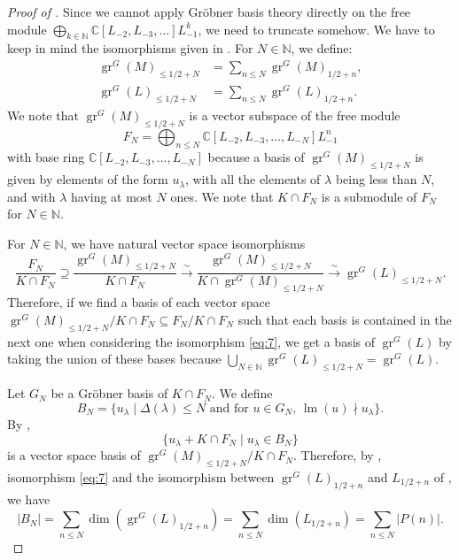 \documentclass[a4paper, 12pt, reqno]{amsart}
\theoremstyle{remark}
\DeclareMathOperator{\gr}{gr}
\DeclareMathOperator{\lm}{lm}
\begin{document}
\begin{proof}[Proof of ]
  Since we cannot apply Gröbner basis theory directly on the free module $\bigoplus_{k \in \mathbb{N}}\mathbb{C}[L_{-2}, L_{-3}, \dots]L_{-1}^k$, we need to truncate somehow.
  We have to keep in mind the isomorphisms given in .
  For $N \in \mathbb{N}$, we define:
  \begin{align*}
    \gr^G(M)_{\le 1/2 + N} &= \sum_{n \le N}\gr^G(M)_{1/2 + n}, \\
    \gr^G(L)_{\le 1/2 + N} &= \sum_{n \le N}\gr^G(L)_{1/2 + n}.
  \end{align*}
  We note that $\gr^G(M)_{\le 1/2 + N}$ is a vector subspace of the free module
  \begin{equation*}
    F_N = \bigoplus_{n \le N}\mathbb{C}[L_{-2}, L_{-3}, \dots, L_{-N}]L_{-1}^n
  \end{equation*}
  with base ring $\mathbb{C}[L_{-2}, L_{-3}, \dots, L_{-N}]$ because a basis of $\gr^G(M)_{\le 1/2 + N}$ is given by elements of the form $u_{\lambda}$, with all the elements of $\lambda$ being less than $N$, and with $\lambda$ having at most $N$ ones.
  We note that $K \cap F_N$ is a submodule of $F_N$ for $N \in \mathbb{N}$.

  For $N \in \mathbb{N}$, we have natural vector space isomorphisms
  \begin{equation}
    \label{eq:7}
    \frac{F_N}{K \cap F_N} \supseteq \frac{\gr^G(M)_{\le 1/2 + N}}{K \cap F_N} \xrightarrow{\sim} \frac{\gr^G(M)_{\le 1/2 + N}}{K \cap \gr^G(M)_{\le 1/2 + N}} \xrightarrow{\sim} \gr^G(L)_{\le 1/2 + N}.
  \end{equation}
  Therefore, if we find a basis of each vector space $\gr^G(M)_{\le 1/2 + N}/K \cap F_N \subseteq F_N/K \cap F_N$ such that each basis is contained in the next one when considering the isomorphism \eqref{eq:7}, we get a basis of $\gr^G(L)$ by taking the union of these bases because $\bigcup_{N \in \mathbb{N}}\gr^G(L)_{\le 1/2 + N} = \gr^G(L)$.

  Let $G_N$ be a Gröbner basis of $K \cap F_N$.
  We define
  \begin{equation*}
    B_N = \{u_{\lambda} \mid \text{$\Delta(\lambda) \le N$ and for $u \in G_N$, $\lm(u) \nmid u_{\lambda}$}\}.
  \end{equation*}
  By \cite[Proposition 3.6.4]{adams_introduction_1994},
  \begin{equation}
    \label{eq:8}
    \{u_{\lambda} + K \cap F_N \mid u_{\lambda} \in B_N\}
  \end{equation}
  is a vector space basis of $\gr^G(M)_{\le 1/2 + N}/K \cap F_N$.
  Therefore, by , isomorphism \eqref{eq:7} and the isomorphism between $\gr^G(L)_{1/2 + n}$ and $L_{1/2 + n}$ of , we have
  \begin{equation*}
    |B_N| = \sum_{n \le N}\dim(\gr^G(L)_{1/2 + n}) = \sum_{n \le N}\dim(L_{1/2 + n}) = \sum_{n \le N}|P(n)|.
  \end{equation*}


\end{proof}
\end{document}
